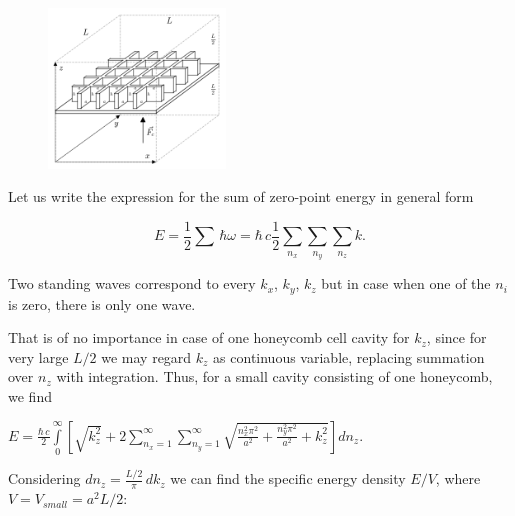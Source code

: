 \documentclass[twoside, 10pt]{article}
\begin{document}
\begin{multicols}{2}
\begin{figure}
\begin{center}
\includegraphics[width=0.42\textwidth]{honeycomb_box_L.png}
\caption{}{}
\end{center}
\label{fig:honeycomb_box_L}
\end{figure}


Let us write the expression for the sum of zero-point energy in general form

\vspace{-3.5mm}
\begin{equation} \label{eq:1}
E = \frac{1}{2}\sum\,\hbar\omega = \hbar\,c\frac{1}{2}\sum\limits_{n_x}^{}\sum\limits_{n_y}^{}\sum\limits_{n_z}^{}k.
\end{equation}
\vspace{-3.5mm}

    Two standing waves correspond to every \(k_x\), \(k_y\), \(k_z\) but in case when one of the \(n_i\) is zero, there is only one wave.

    That is of no importance in case of one honeycomb cell cavity for \(k_z\),
since for very large \(L/2\) we may regard \(k_z\) as
continuous variable, replacing summation over \(n_z\) with integration.
Thus, for a small cavity consisting of one honeycomb, we find

\noindent
\(E = \frac{\hbar\,c}{2}\int\limits_{0}^{\infty}\left[{\sqrt{k_z^2}+2\sum\limits_{n_x=1}^{\infty}\sum\limits_{n_y=1}^{\infty}\sqrt{\frac{n_x^2 \pi^2}{a^2}+\frac{n_y^2 \pi^2}{a^2}+k_z^2}}\right]d{n_z}\).

   Considering \(dn_z = \frac{L/2}{\pi}\,dk_z\) we can find the specific energy density \(E/V\), where
\(V = V_{small} = a^2 L/2\):



\end{multicols}
\end{document}
